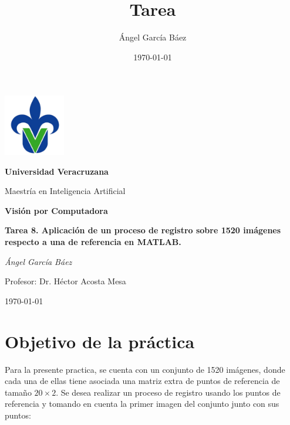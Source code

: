\documentclass[11pt, letterpaper]{article}
\title{\bfseries Tarea}
\author{Ángel García Báez}
\date{\today}
\begin{document}
	
	\begin{titlepage}
		\centering
		\includegraphics[width=0.2\textwidth]{logo.png}\par
		\vspace{1cm}
		{\LARGE \bfseries Universidad Veracruzana \par}
		\vspace{1cm}
		{\Large Maestría en Inteligencia Artificial\par}
		\vspace{3cm}
		{\LARGE \bfseries Visión por Computadora \par}
		\vspace{1cm}
		{\Large \bfseries Tarea 8. Aplicación de un proceso de registro sobre 1520 imágenes respecto a una de referencia en MATLAB. \par}
		\vfill
		{\Large \textit{Ángel García Báez}\par}
		\vspace{1cm}
		{\Large Profesor: Dr. Héctor Acosta Mesa \par}
		\vfill
		{\Large \today \par}
	\end{titlepage}
	
	\newpage
	\tableofcontents
	\newpage
	
\section{Objetivo de la práctica}

Para la presente practica, se cuenta con un conjunto de 1520 imágenes, donde cada una de ellas tiene asociada una matriz extra de puntos de referencia de tamaño $20 \times 2$. Se desea realizar un proceso de registro usando los puntos de referencia y tomando en cuenta la primer imagen del conjunto junto con sus puntos:
\end{document}
